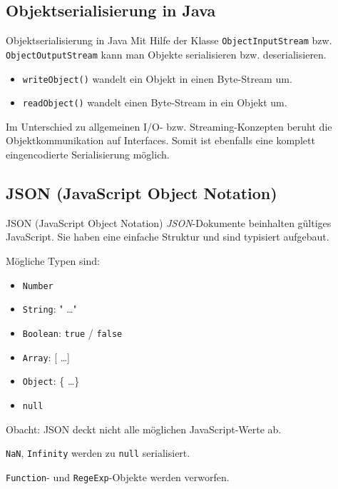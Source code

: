 \subsection{Objektserialisierung in Java}

\begin{bonus}{Objektserialisierung in Java}
    Mit Hilfe der Klasse \texttt{ObjectInputStream} bzw. \texttt{ObjectOutputStream} kann man Objekte serialisieren bzw. deserialisieren.

    \begin{itemize}
        \item \texttt{writeObject()} wandelt ein Objekt in einen Byte-Stream um.
        \item \texttt{readObject()} wandelt einen Byte-Stream in ein Objekt um.
    \end{itemize}

    Im Unterschied zu allgemeinen I/O- bzw. Streaming-Konzepten beruht die Objektkommunikation auf Interfaces.
    Somit ist ebenfalls eine komplett eingencodierte Serialisierung möglich.
\end{bonus}

\subsection{JSON (JavaScript Object Notation)}

\begin{defi}{JSON (JavaScript Object Notation)}
    \emph{JSON}-Dokumente beinhalten gültiges JavaScript.
    Sie haben eine einfache Struktur und sind typisiert aufgebaut.

    Mögliche Typen sind:
    \begin{itemize}
        \item \texttt{Number}
        \item \texttt{String}: " \ldots "
        \item \texttt{Boolean}: \texttt{true} / \texttt{false}
        \item \texttt{Array}: [ \ldots ]
        \item \texttt{Object}: \{ \ldots \}
        \item \texttt{null}
    \end{itemize}

    Obacht: JSON deckt nicht alle möglichen JavaScript-Werte ab.

    \texttt{NaN}, \texttt{Infinity} werden zu \texttt{null} serialisiert.

    \texttt{Function}- und \texttt{RegeExp}-Objekte werden verworfen.
\end{defi}

